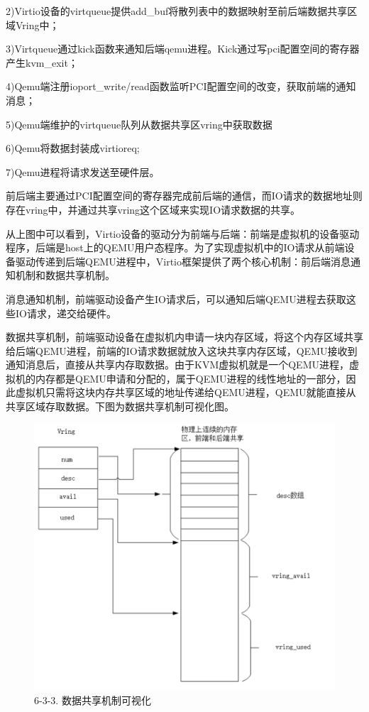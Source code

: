 2)Virtio设备的virtqueue提供add_buf将散列表中的数据映射至前后端数据共享区域Vring中；

3)Virtqueue通过kick函数来通知后端qemu进程。Kick通过写pci配置空间的寄存器产生kvm_exit；

4)Qemu端注册ioport_write/read函数监听PCI配置空间的改变，获取前端的通知消息；

5)Qemu端维护的virtqueue队列从数据共享区vring中获取数据

6)Qemu将数据封装成virtioreq;

7)Qemu进程将请求发送至硬件层。

前后端主要通过PCI配置空间的寄存器完成前后端的通信，而IO请求的数据地址则存在vring中，并通过共享vring这个区域来实现IO请求数据的共享。

从上图中可以看到，Virtio设备的驱动分为前端与后端：前端是虚拟机的设备驱动程序，后端是host上的QEMU用户态程序。为了实现虚拟机中的IO请求从前端设备驱动传递到后端QEMU进程中，Virtio框架提供了两个核心机制：前后端消息通知机制和数据共享机制。

消息通知机制，前端驱动设备产生IO请求后，可以通知后端QEMU进程去获取这些IO请求，递交给硬件。

数据共享机制，前端驱动设备在虚拟机内申请一块内存区域，将这个内存区域共享给后端QEMU进程，前端的IO请求数据就放入这块共享内存区域，QEMU接收到通知消息后，直接从共享内存取数据。由于KVM虚拟机就是一个QEMU进程，虚拟机的内存都是QEMU申请和分配的，属于QEMU进程的线性地址的一部分，因此虚拟机只需将这块内存共享区域的地址传递给QEMU进程，QEMU就能直接从共享区域存取数据。下图为数据共享机制可视化图。
\begin{figure}[H]
    \centering
    \includegraphics{figures/06-03-3.png}
    \caption{6-3-3. 数据共享机制可视化}
\end{figure}